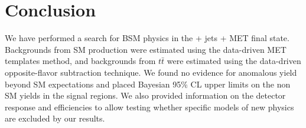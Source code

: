 \section{Conclusion}
\label{sec:conclusion}

We have performed a search for BSM physics in the \Z + jets + MET final state.
Backgrounds from SM \Z production were estimated using the data-driven
MET templates method, and backgrounds from $t\bar{t}$ were estimated using
the data-driven opposite-flavor subtraction technique. We found no evidence
for anomalous yield beyond SM expectations and placed Bayesian 95\% CL upper limits
on the non SM yields in the signal regions. We also provided information on
the detector response and efficiencies to allow testing whether specific models
of new physics are excluded by our results.
